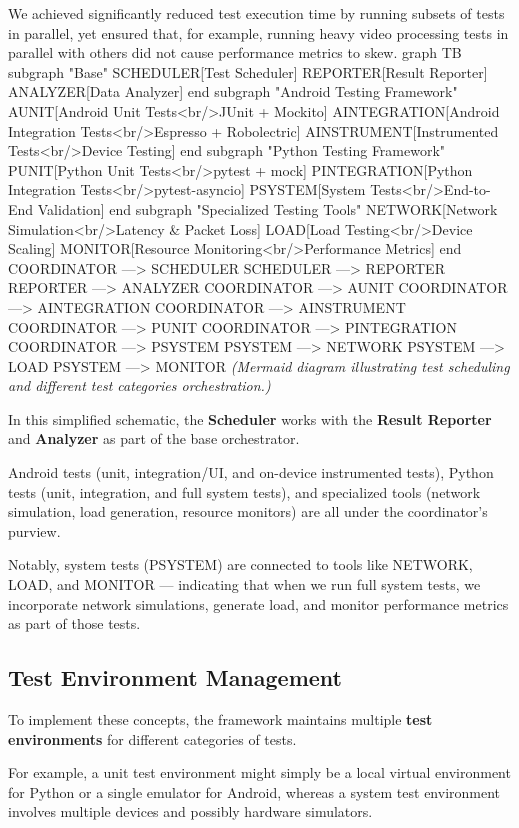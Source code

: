 {{We achieved significantly reduced test execution time by running subsets of tests in
parallel, yet ensured that, for example, running heavy video processing tests in
parallel with others did not cause performance metrics to skew.  graph TB subgraph
"Base" SCHEDULER[Test Scheduler] REPORTER[Result Reporter] ANALYZER[Data Analyzer]
end subgraph "Android Testing Framework" AUNIT[Android Unit Tests<br/>JUnit +
Mockito] AINTEGRATION[Android Integration Tests<br/>Espresso + Robolectric]
AINSTRUMENT[Instrumented Tests<br/>Device Testing] end subgraph "Python Testing
Framework" PUNIT[Python Unit Tests<br/>pytest + mock] PINTEGRATION[Python Integration
Tests<br/>pytest-asyncio] PSYSTEM[System Tests<br/>End-to-End Validation] end
subgraph "Specialized Testing Tools" NETWORK[Network Simulation<br/>Latency \& Packet
Loss] LOAD[Load Testing<br/>Device Scaling] MONITOR[Resource
Monitoring<br/>Performance Metrics] end COORDINATOR ---> SCHEDULER SCHEDULER --->
REPORTER REPORTER ---> ANALYZER COORDINATOR ---> AUNIT COORDINATOR ---> AINTEGRATION
COORDINATOR ---> AINSTRUMENT COORDINATOR ---> PUNIT COORDINATOR ---> PINTEGRATION
COORDINATOR ---> PSYSTEM PSYSTEM ---> NETWORK PSYSTEM ---> LOAD PSYSTEM ---> MONITOR
\textit{(Mermaid diagram illustrating test scheduling and different test categories
orchestration.)}

In this simplified schematic, the \textbf{Scheduler}
 works with the \textbf{Result Reporter}
 and \textbf{Analyzer}
 as part of the base orchestrator.

Android tests (unit, integration/UI, and on-device instrumented tests), Python tests
(unit, integration, and full system tests), and specialized tools (network
simulation, load generation, resource monitors) are all under the coordinator's
purview.

Notably, system tests (PSYSTEM) are connected to tools like NETWORK, LOAD, and
MONITOR --- indicating that when we run full system tests, we incorporate network
simulations, generate load, and monitor performance metrics as part of those tests.

\subsection{Test Environment Management}

To implement these concepts, the framework maintains multiple \textbf{test
environments}
 for different categories of tests.

For example, a unit test environment might simply be a local virtual environment for
Python or a single emulator for Android, whereas a system test environment involves
multiple devices and possibly hardware simulators.

}}
